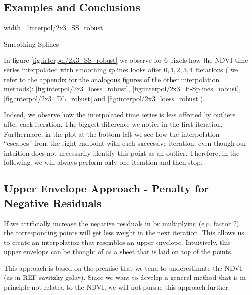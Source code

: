 {	\subsection{Examples and Conclusions}{
		\begin{my_figure}[h]{width=1\textwidth}{interpol/2x3_SS_robust}
			\caption{Smoothing Splines \RobItPlot}
			\label{fig:interpol/2x3_SS_robust}
		\end{my_figure}

		In figure \ref{fig:interpol/2x3_SS_robust} we observe for 6 pixels how the NDVI time series interpolated with smoothing splines looks after $0,1,2,3,4$ iterations ( we refer to the appendix for the analogous figures of the other interpolation methods): \ref{fig:interpol/2x3_loess_robust}, \ref{fig:interpol/2x3_B-Splines_robust}, \ref{fig:interpol/2x3_DL_robust} and \ref{fig:interpol/2x3_loess_robust}).
		
		Indeed, we observe how the interpolated time series is less affected by outliers after each iteration. The biggest difference we notice in the first iteration. Furthermore, in the plot at the bottom left we see how the interpolation ``escapes'' from the right endpoint with each successive iteration, even though our intuition does not necessarily identify this point as an outlier. Therefore, in the following, we will always perform only one iteration and then stop.

	} 
	
	\subsection{Upper Envelope Approach - Penalty for Negative Residuals}
		If we artificially increase the negative residuals in  by multiplying (e.g. factor 2), the corresponding points will get less weight in the next iteration. This allows us to create an interpolation that resembles an upper envelope. Intuitively, this upper envelope can be thought of as a sheet that is laid on top of the points.
			
		This approach is based on the premise that we tend to underestimate the NDVI (as in REF-savitzky-golay). Since we want to develop a general method that is in principle not related to the NDVI, we will not pursue this approach further.	
}
